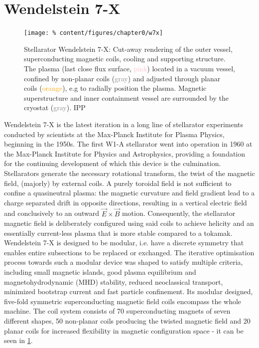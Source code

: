     \section{Wendelstein 7-X}\label{sec:w7x}%
%
        \begin{figure}%
            \centering%
            \texttt{[image: \%
                content/figures/chapter0/w7x]}%
            \caption{Stellarator Wendelstein 7-X: Cut-away rendering of the outer vessel, superconducting magnetic coils, cooling and supporting structure. The plasma (last close flux surface, \textcolor{pink}{pink}) located in a vacuum vessel, confined by non-planar coils (\textcolor{gray}{gray}) and adjusted through planar coils (\textcolor{orange}{orange}), e.g to radially position the plasma. Magnetic superstructure and inner containment vessel are surrounded by the cryostat (\textcolor{gray}{gray}). \textcopyright IPP}\label{fig:w7x}%
        \end{figure}%
%
        Wendelstein 7-X is the latest iteration in a long line of stellarator experiments conducted by scientists at the Max-Planck Institute for Plasma Physics, beginning in the 1950s. The first W1-A stellarator went into operation in 1960 at the Max-Planck Institute for Physics and Astrophysics, providing a foundation for the continuing development of which this device is the culmination.\\%
        Stellarators generate the necessary rotational transform, the twist of the magnetic field, (majorly) by external coils. A purely toroidal field is not sufficient to confine a quasineutral plasma: the magnetic curvature and field gradient lead to a charge separated drift in opposite directions, resulting in a vertical electric field and conclusively to an outward $\vec{E}\times\vec{B}$ motion. Consequently, the stellarator magnetic field is deliberately configured using said coils to achieve helicity and an essentially current-less plasma that is more stable compared to a tokamak. Wendelstein 7-X is designed to be modular, i.e. have a discrete symmetry that enables entire subsections to be replaced or exchanged. The iterative optimisation process towards such a modular device was shaped to satisfy multiple criteria, including small magnetic islands, good plasma equilibrium and magnetohydrodynamic (MHD) stability, reduced neoclassical transport, minimized bootstrap current and fast particle confinement. Its modular designed, five-fold symmetric superconducting magnetic field coils encompass the whole machine. The coil system consists of 70 superconducting magnets of seven different shapes, 50 non-planar coils producing the twisted magnetic field and 20 planar coils for increased flexibility in magnetic configuration space - it can be seen in \cref{fig:w7x}\cite{Spitzer1958,Boozer1998,Wagner1998,Beidler1990}.\\%
